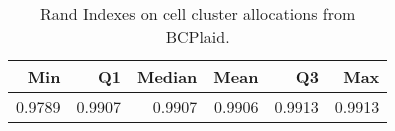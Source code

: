 \begin{table}[ht]
\caption{Rand Indexes on cell cluster allocations from BCPlaid.} \label{tab:pbmc_bcplaid_cellclust}
\centering
\begin{tabular}{rrrrrr}
  \toprule
Min & Q1 & Median & Mean & Q3 & Max \\ 
  \midrule
0.9789 & 0.9907 & 0.9907 & 0.9906 & 0.9913 & 0.9913 \\ 
   \bottomrule
\end{tabular}
\end{table}
